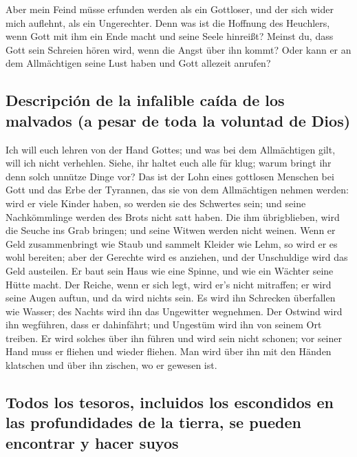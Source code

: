  Aber mein Feind müsse erfunden werden als ein Gottloser,
und der sich wider mich auflehnt, als ein Ungerechter. 
Denn was ist die Hoffnung des Heuchlers, wenn Gott mit ihm ein Ende
macht und seine Seele hinreißt?  Meinst du, dass Gott sein
Schreien hören wird, wenn die Angst über ihn kommt?  Oder
kann er an dem Allmächtigen seine Lust haben und Gott allezeit anrufen?

\hypertarget{descripciuxf3n-de-la-infalible-cauxedda-de-los-malvados-a-pesar-de-toda-la-voluntad-de-dios}{%
\subsection{Descripción de la infalible caída de los malvados (a pesar
de toda la voluntad de
Dios)}\label{descripciuxf3n-de-la-infalible-cauxedda-de-los-malvados-a-pesar-de-toda-la-voluntad-de-dios}}

 Ich will euch lehren von der Hand Gottes; und was bei
dem Allmächtigen gilt, will ich nicht verhehlen.  Siehe,
ihr haltet euch alle für klug; warum bringt ihr denn solch unnütze Dinge
vor?  Das ist der Lohn eines gottlosen Menschen bei Gott
und das Erbe der Tyrannen, das sie von dem Allmächtigen nehmen werden:
 wird er viele Kinder haben, so werden sie des Schwertes
sein; und seine Nachkömmlinge werden des Brots nicht satt haben.
 Die ihm übrigblieben, wird die Seuche ins Grab bringen;
und seine Witwen werden nicht weinen.  Wenn er Geld
zusammenbringt wie Staub und sammelt Kleider wie Lehm, 
so wird er es wohl bereiten; aber der Gerechte wird es anziehen, und der
Unschuldige wird das Geld austeilen.  Er baut sein Haus
wie eine Spinne, und wie ein Wächter seine Hütte macht. 
Der Reiche, wenn er sich legt, wird er's nicht mitraffen; er wird seine
Augen auftun, und da wird nichts sein.  Es wird ihn
Schrecken überfallen wie Wasser; des Nachts wird ihn das Ungewitter
wegnehmen.  Der Ostwind wird ihn wegführen, dass er
dahinfährt; und Ungestüm wird ihn von seinem Ort treiben.
 Er wird solches über ihn führen und wird sein nicht
schonen; vor seiner Hand muss er fliehen und wieder fliehen.
 Man wird über ihn mit den Händen klatschen und über ihn
zischen, wo er gewesen ist.

\hypertarget{todos-los-tesoros-incluidos-los-escondidos-en-las-profundidades-de-la-tierra-se-pueden-encontrar-y-hacer-suyos}{%
\subsection{Todos los tesoros, incluidos los escondidos en las
profundidades de la tierra, se pueden encontrar y hacer
suyos}\label{todos-los-tesoros-incluidos-los-escondidos-en-las-profundidades-de-la-tierra-se-pueden-encontrar-y-hacer-suyos}}

